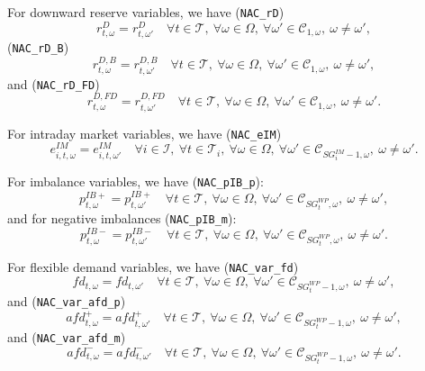\documentclass{article}
\begin{document}
For downward reserve variables, we have (\verb|NAC_rD|)
\begin{equation} \label{EQ:NAC_pVRD}
	r^D_{t, \omega} = r^D_{t, \omega'} \quad \forall t \in \mathcal{T}, \ \forall \omega \in \Omega, \ \forall \omega' \in \mathcal{C}_{1, \omega}, \ \omega \neq \omega',
\end{equation}
(\verb|NAC_rD_B|)
\begin{equation} \label{EQ:NAC_rDB}
	r^{D, B}_{t, \omega} = r^{D, B}_{t, \omega'} \quad \forall t \in \mathcal{T}, \ \forall \omega \in \Omega, \ \forall \omega' \in \mathcal{C}_{1, \omega}, \ \omega \neq \omega',
\end{equation}
and (\verb|NAC_rD_FD|)
\begin{equation} \label{EQ:NAC_rDFD}
	r^{D, FD}_{t, \omega} = r^{D, FD}_{t, \omega'} \quad \forall t \in \mathcal{T}, \ \forall \omega \in \Omega, \ \forall \omega' \in \mathcal{C}_{1, \omega}, \ \omega \neq \omega'.
\end{equation}


For intraday market variables, we have (\verb|NAC_eIM|)
\begin{equation} \label{EQ:NAC_mUC}
	e^{IM}_{i, t, \omega} = e^{IM}_{i, t, \omega'} \quad \forall i \in \mathcal{I}, \ \forall t \in \mathcal{T}_i, \ \forall \omega \in \Omega, \ \forall \omega' \in \mathcal{C}_{SG^{IM}_i -1, \omega}, \ \omega \neq \omega'.
\end{equation}


For imbalance variables, we have (\verb|NAC_pIB_p|):
\begin{equation} \label{EQ:NAC_pPIB}
	p^{IB+}_{t, \omega} = p^{IB+}_{t, \omega'} \quad \forall t \in \mathcal{T}, \ \forall \omega \in \Omega, \ \forall \omega' \in \mathcal{C}_{SG^{WP}_t, \omega}, \ \omega \neq \omega',
\end{equation}
and for negative imbalances (\verb|NAC_pIB_m|):
\begin{equation} \label{EQ:NAC_pNIB}
	p^{IB-}_{t, \omega} = p^{IB-}_{t, \omega'} \quad \forall t \in \mathcal{T}, \ \forall \omega \in \Omega, \ \forall \omega' \in \mathcal{C}_{SG^{WP}_t, \omega}, \ \omega \neq \omega'.
\end{equation}


For flexible demand variables, we have (\verb|NAC_var_fd|)
\begin{equation} \label{EQ:NAC_var_fd}
	fd_{t, \omega} = fd_{t, \omega'} \quad \forall t \in \mathcal{T}, \ \forall \omega \in \Omega, \ \forall \omega' \in \mathcal{C}_{SG^{WP}_t - 1, \omega}, \ \omega \neq \omega',
\end{equation}
and (\verb|NAC_var_afd_p|)
\begin{equation} \label{EQ:NAC_var_afd_p}
	afd^+_{t, \omega} = afd^+_{t, \omega'} \quad \forall t \in \mathcal{T}, \ \forall \omega \in \Omega, \ \forall \omega' \in \mathcal{C}_{SG^{WP}_t - 1, \omega}, \ \omega \neq \omega',
\end{equation}
and (\verb|NAC_var_afd_m|)
\begin{equation} \label{EQ:NAC_var_afd_m}
	afd^-_{t, \omega} = afd^-_{t, \omega'} \quad \forall t \in \mathcal{T}, \ \forall \omega \in \Omega, \ \forall \omega' \in \mathcal{C}_{SG^{WP}_t - 1, \omega}, \ \omega \neq \omega'.
\end{equation}
\end{document}
